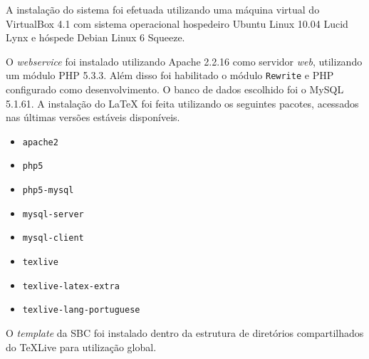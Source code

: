 \documentclass{article}
\begin{document}
A instalação do sistema foi efetuada utilizando uma máquina virtual do
VirtualBox 4.1 com sistema operacional hospedeiro Ubuntu Linux 10.04 Lucid Lynx
e hóspede Debian Linux 6 Squeeze.

O \emph{webservice} foi instalado utilizando Apache 2.2.16 como servidor
\emph{web}, utilizando um módulo PHP 5.3.3. Além disso foi habilitado o módulo
\texttt{Rewrite} e PHP configurado como desenvolvimento. O banco de dados
escolhido foi o MySQL 5.1.61. A instalação do \LaTeX{} foi feita utilizando os
seguintes pacotes, acessados nas últimas versões estáveis disponíveis.

\begin{itemize}
    \item \texttt{apache2}
    \item \texttt{php5}
    \item \texttt{php5-mysql}
    \item \texttt{mysql-server}
    \item \texttt{mysql-client}
    \item \texttt{texlive}
    \item \texttt{texlive-latex-extra}
    \item \texttt{texlive-lang-portuguese}
\end{itemize}

O \emph{template} da SBC foi instalado dentro da estrutura de diretórios
compartilhados do \TeX{}Live para utilização global.
\end{document}
